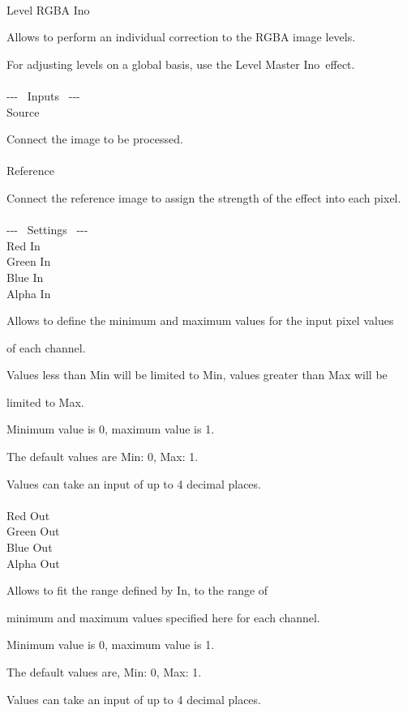\documentclass[a4paper,12pt]{article}
\begin{document}
\thispagestyle{empty}

\Large
\noindent \\
Level RGBA Ino\medskip
\par
\normalsize
Allows to perform an individual correction to the RGBA image levels.\par
For adjusting levels on a global basis, use the \textquotedbl Level Master Ino\textquotedbl \ effect.\\
\\
-{-}- \ Inputs \ -{-}-\\
Source\par
Connect the image to be processed.\\
\\
Reference\par
Connect the reference image to assign the strength of the effect into each pixel.\\
\\
-{-}- \ Settings \ -{-}-\\
Red In\\
Green In\\
Blue In\\
Alpha In\par
Allows to define the minimum and maximum values for the input pixel values\par 
of each channel.\par
Values less than Min will be limited to Min, values greater than Max will be\par 
limited to Max.\par
Minimum value is 0, maximum value is 1.\par
The default values are Min: 0, Max: 1.\par
Values can take an input of up to 4 decimal places.\\
\\
Red Out\\
Green Out\\
Blue Out\\
Alpha Out\par
Allows to fit the range defined by \textquotedbl In\textquotedbl , to the range of\par 
minimum and maximum values specified here for each channel.\par
Minimum value is 0, maximum value is 1.\par
The default values are, Min: 0, Max: 1.\par
Values can take an input of up to 4 decimal places.\\
\end{document}
